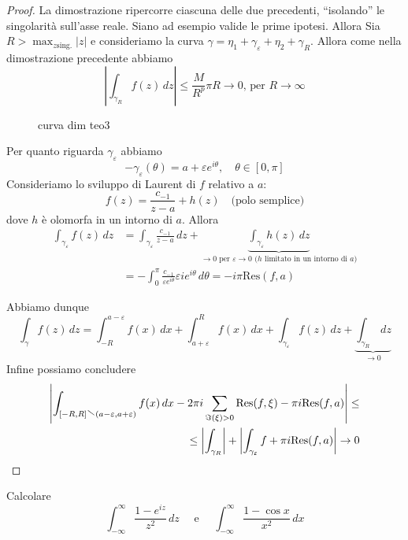 \begin{proof}
    La dimostrazione ripercorre ciascuna delle due precedenti, ``isolando'' le
    singolarità sull'asse reale. Siano ad esempio valide le prime ipotesi.
    Allora Sia \(R > \max_{z \text{sing.}}  |z|\) e consideriamo la curva
    \(\gamma = \eta_{1} + \gamma_\varepsilon + \eta_{2} + \gamma_R\). Allora
    come nella dimostrazione precedente abbiamo
    \[
      \left| \int _{\gamma_R} f{(z)} \,dz \right| \le \frac{M}{R^p}\pi R \to 0
      \text{,  per } R \to \infty
    \]
\begin{figure}[ht]
    \centering
    \caption{curva dim teo3}
    \label{fig:curva-dim-teo3}
\end{figure}
    Per quanto riguarda \(\gamma_\varepsilon\) abbiamo
    \[
      -\gamma_\varepsilon {(\theta)} = a + \varepsilon e ^{i\theta}, \quad
      \theta \in [0, \pi]
    \]
    Consideriamo lo sviluppo di Laurent di \(f\) relativo a \(a\):
    \[
      f{(z)} = \frac{c_{-1}}{z-a} + h{(z)} \quad \text{(polo semplice)}
    \]
    dove \(h\) è olomorfa in un intorno di \(a\). Allora
    \begin{align*}
        \int_{\gamma_\varepsilon}f{(z)}  \,dz &=
      \int_{\gamma_\varepsilon}\frac{c_{-1}}{z-a}  \,d z +
      \underbrace{\int_{\gamma_\varepsilon} h{(z)} \,d z}_{\to  0 \text{ per }
      \varepsilon \to 0 \text{ (\(h\) limitato in un intorno di \(a\))}} \\
      &= -\int_{0}^{\pi} \frac{c_{-1} }{\varepsilon e^{i\theta}}\varepsilon i
      e^{i\theta} \,d \theta = -i \pi \mathrm{Res} {(f,a)}
    \end{align*}
    
    Abbiamo dunque
    \[
      \int _{\gamma} f{(z)} \,dz = \int_{-R}^{a-\varepsilon} f{(x)} \,dx +
      \int_{a+\varepsilon}^{R} f{(x)}  \,dx + \int_{\gamma_\varepsilon} f{(z)}
      \,dz + \underbrace{\int_{\gamma_R}  \,dz}_{\to 0 } 
    \]
    Infine possiamo concludere
    \begin{align*}
        \left| \int_{[-R, R] \sminus {(a-\varepsilon, a+\varepsilon)}} f{(x)}
        \,dx  - 2\pi i \sum_{\Im {(\xi)}> 0} \mathrm{Res}{(f, \xi)} - \pi i
        \mathrm{Res} {(f, a)}\right|\le \\ \le  \left| \int _{\gamma_R}\right| +
        \left| \int _{\gamma_\varepsilon} f + \pi i \mathrm{Res}{(f, a)}\right|
        \to 0
    \end{align*}
\end{proof}

\begin{eser}
    Calcolare 
    \[
        \int_{-\infty}^{\infty} \frac{1-e^{iz}}{z^2} \,dz 
        \quad \text{   e   }\quad
        \int_{-\infty}^{\infty} \frac{1-\cos x}{x^2} \,dx \tag*{[\pi
        entrambi]}
    \]
\end{eser}

